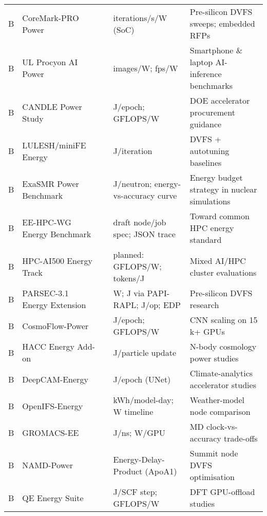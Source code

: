 \begin{table*}[hptb]
\begin{tabularx}{1.0\textwidth}{|llllX|}
B & CoreMark-PRO Power           & \cite{coremarkpro}          & iterations/s/W (SoC)                 & Pre-silicon DVFS sweeps; embedded RFPs \\ 
B & UL Procyon AI Power          & \cite{procyon}              & images/W; fps/W                     & Smartphone \& laptop AI-inference benchmarks \\
B & CANDLE Power Study           & \cite{candlepowerstud}      & J/epoch; GFLOPS/W                   & DOE accelerator procurement guidance \\
B & LULESH/miniFE Energy       & \cite{luleshminifeene}      & J/iteration                            & DVFS + autotuning baselines \\
B & ExaSMR Power Benchmark       & \cite{exasmrpowerbenc}      & J/neutron; energy-vs-accuracy curve   & Energy budget strategy in nuclear simulations \\
B & EE-HPC-WG Energy Benchmark   & \cite{eehpcwgenergybe}      & draft node/job spec; JSON trace       & Toward common HPC energy standard \\
B & HPC-AI500 Energy Track       & \cite{hpcai500energyt}      & planned: GFLOPS/W; tokens/J         & Mixed AI/HPC cluster evaluations \\
B & PARSEC-3.1 Energy Extension  & \cite{parsec31energye}      & W; J via PAPI-RAPL; J/op; EDP       & Pre-silicon DVFS research \\
B & CosmoFlow-Power              & \cite{cosmoflow2019}        & J/epoch; GFLOPS/W                   & CNN scaling on 15 k+ GPUs \\
B & HACC Energy Add-on           & \cite{hacc2020power}        & J/particle update                      & N-body cosmology power studies \\
B & DeepCAM-Energy               & \cite{deepcam2020power}     & J/epoch (UNet)                         & Climate-analytics accelerator studies \\
B & OpenIFS-Energy               & \cite{openifsenergy2023}    & kWh/model-day; W timeline             & Weather-model node comparison \\
B & GROMACS-EE                   & \cite{gromacsee2024}        & J/ns; W/GPU                         & MD clock-vs-accuracy trade-offs \\
B & NAMD-Power                   & \cite{namdpower2019}        & Energy-Delay-Product (ApoA1)             & Summit node DVFS optimisation \\
B & QE Energy Suite              & \cite{qeenergy2022}         & J/SCF step; GFLOPS/W                & DFT GPU-offload studies \\

\end{tabularx}
\end{table*}
